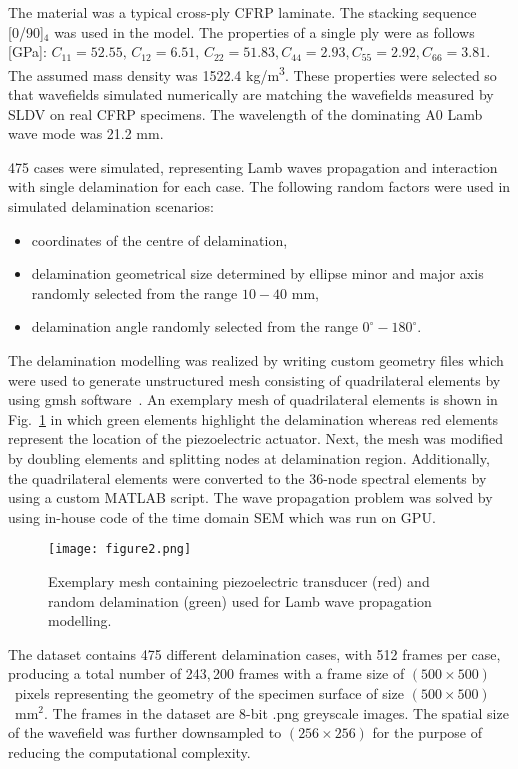 \documentclass[pdflatex,sn-mathphys-num]{sn-jnl}%
\begin{document}
	The material was a typical cross-ply CFRP laminate. 
	The stacking sequence [0/90]\(_4\) was used in the model. 
	The properties of a single ply were as follows [GPa]:
	\(C_{11} = 52.55, \, C_{12} = 6.51, \, C_{22} = 51.83, C_{44} = 2.93, 
	C_{55} = 
	2.92, C_{66} = 3.81\). 
	The assumed mass density was 1522.4 kg/m\textsuperscript{3}.
	These properties were selected so that wavefields simulated numerically are 
	matching the wavefields measured by SLDV on real CFRP specimens.
	The wavelength of the dominating A0 Lamb wave mode was 21.2 mm.
	
	475 cases were simulated, representing Lamb waves propagation and 
	interaction 
	with single delamination for each case. 
	The following random factors were used in simulated delamination scenarios:
	\begin{itemize}
		\item coordinates of the centre of delamination,
		\item delamination geometrical size	determined by ellipse minor and 
		major axis randomly selected from the range $10-40$ mm,
		\item delamination angle randomly selected from the range $ 
		0^{\circ}-180^{\circ}$.
		
	\end{itemize}
	The delamination modelling was realized by writing custom geometry files 
	which were used to generate unstructured mesh consisting of quadrilateral 
	elements by using gmsh software~\cite{Geuzaine2009}.
	An exemplary mesh of quadrilateral elements is shown in 
	Fig.~\ref{fig:random_delam_mesh} in which green elements highlight the 
	delamination whereas red elements represent the location of the 
	piezoelectric actuator.
	Next, the mesh was modified by doubling elements and splitting nodes at 
	delamination region.
	Additionally, the quadrilateral elements were converted to the 36-node 
	spectral elements by using a custom MATLAB script.
	The wave propagation problem was solved by using in-house code of the time 
	domain SEM which was run on GPU.
	\begin{figure} [h!]
		\begin{center}
			\texttt{[image: figure2.png]}
		\end{center}
		\caption{Exemplary mesh containing piezoelectric transducer (red) and 
		random delamination (green) used for Lamb wave propagation modelling.} 
		\label{fig:random_delam_mesh}
	\end{figure}
	The dataset contains 475 different delamination cases, with 512 frames per 
	case, producing a total number of 243,\,200 frames with a frame size of 
	\((500\times500)\)~pixels representing the geometry of the specimen surface 
	of size \((500\times500)\)~mm\(^{2}\).
	The frames in the dataset are 8-bit .png greyscale images.
	The spatial size of the wavefield was further downsampled to 
	\((256\times256)\) for the purpose of 
	reducing the computational complexity.
	
\end{document}
